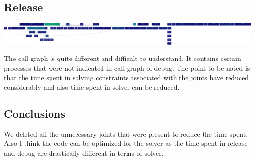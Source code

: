 \documentclass[11pt]{article}
\begin{document}
\subsection{Release}
\begin{center}
	\includegraphics[scale=0.07]{release}
\end{center}
The call graph is quite different and difficult to understand. It contains certain processes that were not indicated in call graph of debug. The point to be noted is that the time spent in solving constraints associated with the joints have reduced considerably and also time spent in solver can be reduced.
 \subsection{Conclusions}
We deleted all the unnecessary joints that were present to reduce the time spent. Also I think the code can be optimized for the solver as the time spent in release and debug are drastically different in terms of solver.



\end{document}
